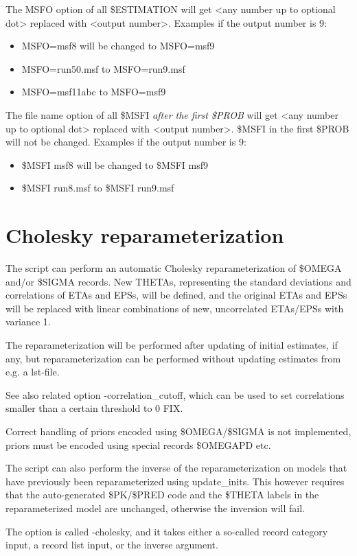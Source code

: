 \noindent The MSFO option of all \$ESTIMATION will get <any number up to optional dot> replaced with <output number>. 
Examples if the output number is 9:
\begin{itemize}
\item MSFO=msf8 will be changed to MSFO=msf9
\item MSFO=run50.msf to MSFO=run9.msf
\item MSFO=msf11abc to MSFO=msf9
\end{itemize}

\noindent The file name option of all \$MSFI \emph{after the first \$PROB} will get 
<any number up to optional dot> replaced with <output number>. \$MSFI in the first \$PROB
will not be changed.
Examples if the output number is 9:
\begin{itemize}
\item \$MSFI msf8 will be changed to \$MSFI msf9
\item \$MSFI run8.msf to \$MSFI run9.msf
\end{itemize}

\section{Cholesky reparameterization}
The script can perform an automatic Cholesky reparameterization of \$OMEGA and/or \$SIGMA records.
New THETAs, representing the standard deviations and correlations of ETAs and EPSs, will be
defined, and the original ETAs and EPSs will be replaced with linear combinations of new, uncorrelated
ETAs/EPSs with variance 1.

The reparameterization will be performed after updating of initial estimates, if any, but
reparameterization can be performed without updating estimates from e.g. a lst-file.

See also related option -correlation\_cutoff, which can be used to set correlations smaller than
a certain threshold to 0 FIX.

Correct handling of priors encoded using \$OMEGA/\$SIGMA is not implemented, priors must 
be encoded using special records \$OMEGAPD etc.

The script can also perform the inverse of the reparameterization on models that have previously been 
reparameterized using update\_inits. This however requires that
the auto-generated \$PK/\$PRED code and the \$THETA labels in the reparameterized model are unchanged,
otherwise the inversion will fail.

The option is called -cholesky, and it takes either a so-called record category input, a record list input,
or the inverse argument.
 
